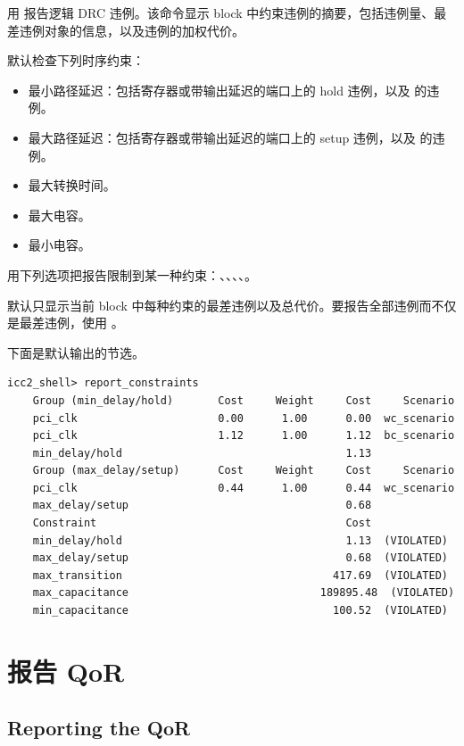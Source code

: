 用  报告逻辑 DRC 违例。该命令显示 block 中约束违例的摘要，包括违例量、最差违例对象的信息，以及违例的加权代价。

默认检查下列时序约束：
\begin{itemize}
  \item 最小路径延迟：包括寄存器或带输出延迟的端口上的 hold 违例，以及  的违例。
  \item 最大路径延迟：包括寄存器或带输出延迟的端口上的 setup 违例，以及  的违例。
  \item 最大转换时间。
  \item 最大电容。
  \item 最小电容。
\end{itemize}

用下列选项把报告限制到某一种约束：、、、、。

默认只显示当前 block 中每种约束的最差违例以及总代价。要报告全部违例而不仅是最差违例，使用 。

下面是默认输出的节选。
\begin{lstlisting}[caption={默认约束报告}]
icc2_shell> report_constraints
    Group (min_delay/hold)       Cost     Weight     Cost     Scenario
    pci_clk                      0.00      1.00      0.00  wc_scenario
    pci_clk                      1.12      1.00      1.12  bc_scenario
    min_delay/hold                                   1.13
    Group (max_delay/setup)      Cost     Weight     Cost     Scenario
    pci_clk                      0.44      1.00      0.44  wc_scenario
    max_delay/setup                                  0.68
    Constraint                                       Cost
    min_delay/hold                                   1.13  (VIOLATED)
    max_delay/setup                                  0.68  (VIOLATED)
    max_transition                                 417.69  (VIOLATED)
    max_capacitance                              189895.48  (VIOLATED)
    min_capacitance                                100.52  (VIOLATED)
\end{lstlisting}

\section{报告 QoR}
\subsection*{Reporting the QoR}

